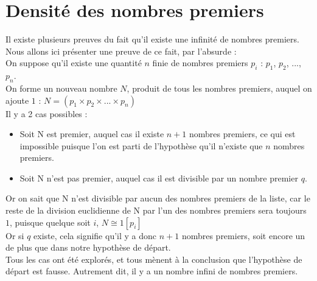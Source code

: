 	\section{Densité des nombres premiers}
		Il existe plusieurs preuves du fait qu'il existe une infinité de nombres premiers. Nous allons ici présenter une preuve de ce fait, par l'absurde :\\
		On suppose qu'il existe une quantité $n$ finie de nombres premiers $p_i$ : $p_1$, $p_2$, $...$, $p_n$.\\
		On forme un nouveau nombre $N$, produit de tous les nombres premiers, auquel on ajoute $1$ : $N = (p_1 \times p_2 \times ... \times p_n)$\\
		Il y a 2 cas possibles :\\
		\begin{itemize}
			\item Soit N est premier, auquel cas il existe $n + 1$ nombres premiers, ce qui est impossible puisque l'on est parti de l'hypothèse qu'il n'existe que $n$ nombres premiers.
			\item Soit N n'est pas premier, auquel cas il est divisible par un nombre premier $q$.
		\end{itemize}
		Or on sait que N n'est divisible par aucun des nombres premiers de la liste, car le reste de la division euclidienne de N par l'un des nombres premiers sera toujours $1$, puisque quelque soit $i$, $N \cong 1 [p_i]$\\
		Or si $q$ existe, cela signifie qu'il y a donc $n + 1$ nombres premiers, soit encore un de plus que dans notre hypothèse de départ.\\
		Tous les cas ont été explorés, et tous mènent à la conclusion que l'hypothèse de départ est fausse. Autrement dit, il y a un nombre infini de nombres premiers.